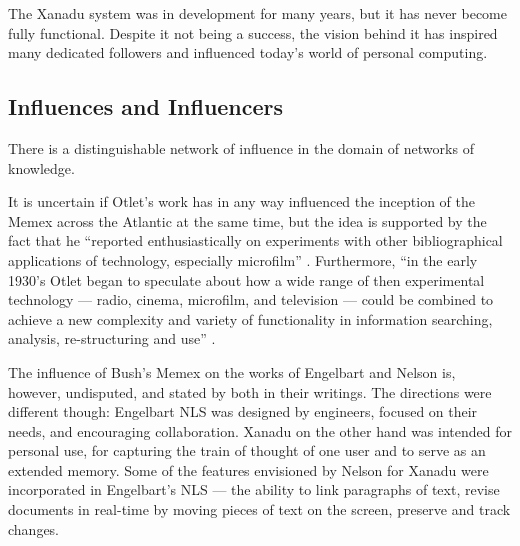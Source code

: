 The Xanadu system was in development for many years, but it has never become fully functional. Despite it not being a success, the vision behind it has inspired many dedicated followers and influenced today's world of personal computing. 

\subsection{Influences and Influencers}

There is a distinguishable network of influence in the domain of networks of knowledge.

It is uncertain if Otlet's work has in any way influenced the inception of the Memex across the Atlantic at the same time, but the idea is supported by the fact that he ``reported enthusiastically on experiments with other bibliographical applications of technology, especially microfilm'' \cite{Goldschmidt1982,Rayward1990}. Furthermore, ``in the early 1930's Otlet began to speculate about how a wide range of then experimental technology --- radio, cinema, microfilm, and television --- could be combined to achieve a new complexity and variety of functionality in information searching, analysis, re-structuring and use'' \cite{Rayward1991}.

The influence of Bush's Memex on the works of Engelbart and Nelson is, however, undisputed, and stated by both in their writings. The directions were different though:  Engelbart NLS was designed by engineers, focused on their needs, and encouraging collaboration. Xanadu on the other hand was intended for personal use, for capturing the train of thought of one user and to serve as an extended memory. Some of the features envisioned by Nelson for Xanadu were incorporated in Engelbart's NLS --- the ability to link paragraphs of text, revise documents in real-time by moving pieces of text on the screen, preserve and track changes.
